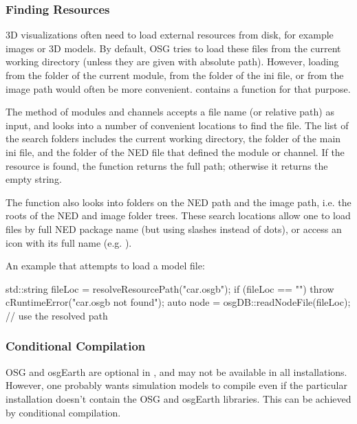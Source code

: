 \subsubsection{Finding Resources}
\label{sec:graphics:finding-resources}

3D visualizations often need to load external resources from disk, for
example images or 3D models. By default, OSG tries to load these files
from the current working directory (unless they are given with absolute path).
However, loading from the folder of the current {\opp} module, from the folder
of the ini file, or from the image path would often be more convenient.
{\opp} contains a function for that purpose.

The  method of modules and channels accepts a
file name (or relative path) as input, and looks into a number of convenient
locations to find the file. The list of the search folders includes
the current working directory, the folder of the main ini file, and the folder
of the NED file that defined the module or channel.
If the resource is found, the function returns the full path; otherwise
it returns the empty string.

The function also looks into folders on the NED path and the image
path, i.e. the roots of the NED and image folder trees. These search
locations allow one to load files by full NED package name (but using
slashes instead of dots), or access an icon with its full name (e.g.
).

An example that attempts to load a  model file:

\begin{cpp}
std::string fileLoc = resolveResourcePath("car.osgb");
if (fileLoc == "")
    throw cRuntimeError("car.osgb not found");
auto node = osgDB::readNodeFile(fileLoc); // use the resolved path
\end{cpp}


\subsubsection{Conditional Compilation}
\label{sec:graphics:osg-conditional-compilation}

OSG and osgEarth are optional in {\opp}, and may not be available in all
installations. However, one probably wants simulation models to compile
even if the particular {\opp} installation doesn't contain the OSG and
osgEarth libraries. This can be achieved by conditional compilation.

